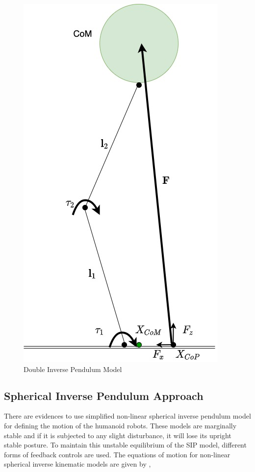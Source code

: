\begin{figure}[h!]
    \centering
    \includegraphics[scale=0.45]{images/DIPM.jpg}\hfill
    \caption{Double Inverse Pendulum Model}\hfill
    \label{dipm}
\end{figure}


\subsection{Spherical Inverse Pendulum Approach}

There are evidences to use simplified non-linear spherical inverse pendulum model for defining the motion of the humanoid robots. These models are marginally stable and if it is subjected to any slight disturbance, it will lose its upright stable posture.
To maintain this unstable equilibrium of the SIP model, different forms of feedback controls are used. The equations of motion for non-linear spherical inverse kinematic models are given by \cite{elhasairi2015humanoid}, 


